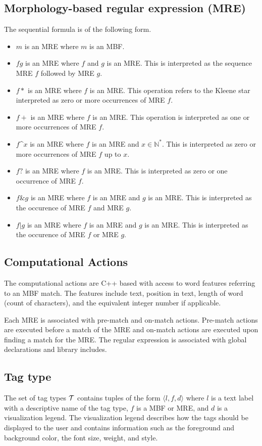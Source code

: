 \subsection{Morphology-based regular expression (MRE)}
The \framework sequential formula is of the following form.
\begin{itemize}
\item $m$ is an MRE where $m$ is an MBF.
\item $fg$ is an MRE where $f$ and $g$ is an MRE. This is interpreted as
the sequence MRE $f$ followed by MRE $g$.
\item $f*$ is an MRE where $f$ is an MRE. 
This operation refers to the Kleene star interpreted as
zero or more occurrences of MRE $f$.
\item $f+$ is an MRE where $f$ is an MRE. 
This operation is interpreted as one or more occurrences of MRE $f$.
\item $f$\textasciicircum$x$ is an MRE where $f$ is an MRE and $x \in \mathbb{N^*}$. 
This is interpreted as zero or more occurrences of MRE $f$ up to $x$.
\item $f?$ is an MRE where $f$ is an MRE. 
This is interpreted as zero or one occurrence of MRE $f$.
\item $f\& g$ is an MRE where $f$ is an MRE and $g$ is an MRE. 
This is interpreted as the occurence of MRE $f$ and MRE $g$.
\item $f|g$ is an MRE where $f$ is an MRE and $g$ is an MRE. 
This is interpreted as the occurence of MRE $f$ or MRE $g$.
\end{itemize}

\subsection{Computational Actions}
The computational actions are C++ based with access to word features referring to 
an MBF match. 
The features include text, position in text, length of word (count of characters), 
and the equivalent integer number if applicable. 

Each MRE is associated with pre-match and on-match actions. 
Pre-match actions are executed before a match of the MRE and on-match actions 
are executed upon finding a match for the MRE. 
The regular expression is associated with global declarations and library includes.

\subsection{Tag type}
The set of tag types ${\cal T}$ contains tuples of the form $\langle l,f,d\rangle$ 
where $l$ is a text label with a descriptive name of the tag type, 
$f$ is a \framework MBF or MRE, and $d$ is a visualization legend. 
The visualization legend describes how the tags should be displayed to the user 
and contains information such as the foreground and background color, the
font size, weight, and style. 

